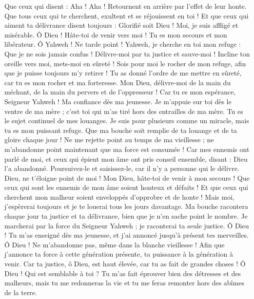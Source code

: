 \begin{multicols}{2}
Que ceux qui disent : Aha ! Aha ! Retournent en arrière par l'effet de leur honte.
Que tous ceux qui te cherchent, exultent et se réjouissent en toi ! Et que ceux qui aiment ta délivrance disent toujours : Glorifié soit Dieu !
Moi, je suis affligé et misérable. Ô Dieu ! Hâte-toi de venir vers moi ! Tu es mon secours et mon libérateur. Ô Yahweh ! Ne tarde point !
\VerseOne{}Yahweh, je cherche en toi mon refuge : Que je ne sois jamais confus !
Délivre-moi par ta justice et sauve-moi ! Incline ton oreille vers moi, mets-moi en sûreté !
Sois pour moi le rocher de mon refuge, afin que je puisse toujours m'y retirer ! Tu as donné l'ordre de me mettre en sûreté, car tu es mon rocher et ma forteresse.
Mon Dieu, délivre-moi de la main du méchant, de la main du pervers et de l'oppresseur !
Car tu es mon espérance, Seigneur Yahweh ! Ma confiance dès ma jeunesse.
Je m'appuie sur toi dès le ventre de ma mère ; c'est toi qui m'as tiré hors des entrailles de ma mère. Tu es le sujet continuel de mes louanges.
Je suis pour plusieurs comme un miracle, mais tu es mon puissant refuge.
Que ma bouche soit remplie de ta louange et de ta gloire chaque jour !
Ne me rejette point au temps de ma vieillesse ; ne m'abandonne point maintenant que ma force est consumée !
Car mes ennemis ont parlé de moi, et ceux qui épient mon âme ont pris conseil ensemble,
disant : Dieu l'a abandonné. Poursuivez-le et saisissez-le, car il n'y a personne qui le délivre.
Dieu, ne t'éloigne point de moi ! Mon Dieu, hâte-toi de venir à mon secours !
Que ceux qui sont les ennemis de mon âme soient honteux et défaits ! Et que ceux qui cherchent mon malheur soient enveloppés d'opprobre et de honte !
Mais moi, j'espèrerai toujours et je te louerai tous les jours davantage.
Ma bouche racontera chaque jour ta justice et ta délivrance, bien que je n'en sache point le nombre.
Je marcherai par la force du Seigneur Yahweh ; je raconterai ta seule justice.
Ô Dieu ! Tu m'as enseigné dès ma jeunesse, et j'ai annoncé jusqu'à présent tes merveilles.
Ô Dieu ! Ne m'abandonne pas, même dans la blanche vieillesse ! Afin que j'annonce ta force à cette génération présente, ta puissance à la génération à venir.
Car ta justice, ô Dieu, est haut élevée, car tu as fait de grandes choses ! Ô Dieu ! Qui est semblable à toi ?
Tu m'as fait éprouver bien des détresses et des malheurs, mais tu me redonneras la vie et tu me feras remonter hors des abîmes de la terre.

\end{multicols}
